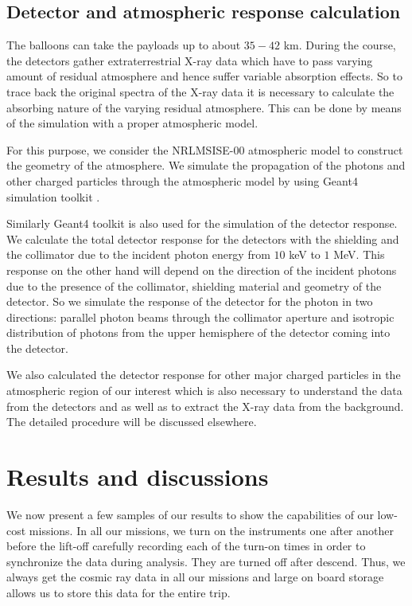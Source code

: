 \subsection{Detector and atmospheric response calculation}
\label{ssec:resp}
The balloons can take the payloads up to about $35-42$ km.
During the course, the detectors gather extraterrestrial X-ray data which have
to pass varying amount of residual atmosphere and hence suffer variable
absorption effects. So to trace back the original spectra of the X-ray data it is
necessary to calculate the absorbing nature of the varying residual
atmosphere. This can be done by means of the simulation with a proper
atmospheric model.

For this purpose, we consider the NRLMSISE-00 atmospheric model \citep{picone03}
to construct the geometry of the atmosphere. We simulate the propagation of the
photons and other charged particles through the atmospheric model by using
Geant4 simulation toolkit \citep{agos03}. 

Similarly Geant4 toolkit is also used for the simulation of the detector response.
We calculate the total detector response for the detectors with the shielding
and the collimator due to the incident photon energy from $10$ keV to $1$ MeV. This
response on the other hand will depend on the direction of the incident photons
due to the presence of the collimator, shielding material and geometry of the
detector. So we simulate the response of the detector for the photon in two
directions: parallel photon beams through the collimator aperture and isotropic
distribution of photons from the upper hemisphere of the detector coming into
the detector.

We also calculated the detector response for other major charged particles in
the atmospheric region of our interest which is also necessary to understand the data
from the detectors and as well as to extract the X-ray data from the background.
The detailed procedure will be discussed elsewhere.

\section{Results and discussions}

We now present a few samples of our results to show the capabilities 
of our low-cost missions. In all our missions, we turn on 
the instruments one after another before the lift-off carefully recording 
each of the turn-on times in order to synchronize the data during analysis. They are 
turned off after descend. Thus, we always get the cosmic ray data 
in all our missions and large on board storage allows us to store this data for the entire trip. 

